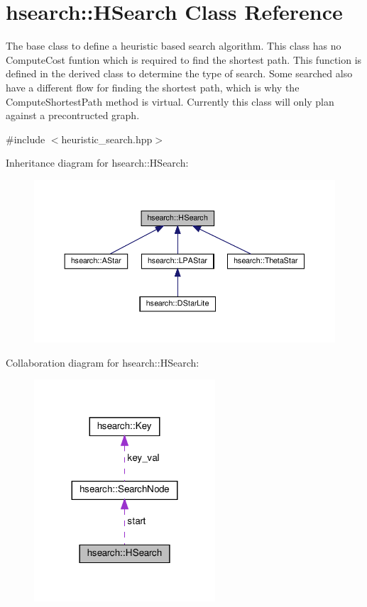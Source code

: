 \hypertarget{classhsearch_1_1HSearch}{}\section{hsearch\+:\+:H\+Search Class Reference}
\label{classhsearch_1_1HSearch}


The base class to define a heuristic based search algorithm. This class has no Compute\+Cost funtion which is required to find the shortest path. This function is defined in the derived class to determine the type of search. Some searched also have a different flow for finding the shortest path, which is why the Compute\+Shortest\+Path method is virtual. Currently this class will only plan against a precontructed graph.  




{\ttfamily \#include $<$heuristic\+\_\+search.\+hpp$>$}



Inheritance diagram for hsearch\+:\+:H\+Search\+:
\nopagebreak
\begin{figure}[H]
\begin{center}
\leavevmode
\includegraphics[width=350pt]{d3/dff/classhsearch_1_1HSearch__inherit__graph}
\end{center}
\end{figure}


Collaboration diagram for hsearch\+:\+:H\+Search\+:
\nopagebreak
\begin{figure}[H]
\begin{center}
\leavevmode
\includegraphics[width=191pt]{df/d1e/classhsearch_1_1HSearch__coll__graph}
\end{center}
\end{figure}
